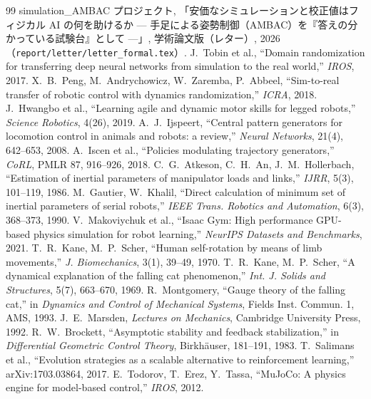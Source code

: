 \documentclass[paper=a4paper,fontsize=10pt,twocolumn,column_gap=2zw,line_length=24zw,number_of_lines=46,head_space=20mm]{jlreq}
\begin{document}
\begin{thebibliography}{99}\footnotesize\setlength{\itemsep}{0pt}
 simulation\_AMBAC プロジェクト, 「安価なシミュレーションと校正値はフィジカル AI の何を助けるか --- 手足による姿勢制御（AMBAC）を『答えの分かっている試験台』として ---」, 学術論文版（レター）, 2026（\texttt{report/letter/letter\_formal.tex}）.
 J.~Tobin et al., ``Domain randomization for transferring deep neural networks from simulation to the real world,'' \textit{IROS}, 2017.
 X.~B.~Peng, M.~Andrychowicz, W.~Zaremba, P.~Abbeel, ``Sim-to-real transfer of robotic control with dynamics randomization,'' \textit{ICRA}, 2018.
 J.~Hwangbo et al., ``Learning agile and dynamic motor skills for legged robots,'' \textit{Science Robotics}, 4(26), 2019.
 A.~J.~Ijspeert, ``Central pattern generators for locomotion control in animals and robots: a review,'' \textit{Neural Networks}, 21(4), 642--653, 2008.
 A.~Iscen et al., ``Policies modulating trajectory generators,'' \textit{CoRL}, PMLR 87, 916--926, 2018.
 C.~G.~Atkeson, C.~H.~An, J.~M.~Hollerbach, ``Estimation of inertial parameters of manipulator loads and links,'' \textit{IJRR}, 5(3), 101--119, 1986.
 M.~Gautier, W.~Khalil, ``Direct calculation of minimum set of inertial parameters of serial robots,'' \textit{IEEE Trans. Robotics and Automation}, 6(3), 368--373, 1990.
 V.~Makoviychuk et al., ``Isaac Gym: High performance GPU-based physics simulation for robot learning,'' \textit{NeurIPS Datasets and Benchmarks}, 2021.
 T.~R.~Kane, M.~P.~Scher, ``Human self-rotation by means of limb movements,'' \textit{J. Biomechanics}, 3(1), 39--49, 1970.
 T.~R.~Kane, M.~P.~Scher, ``A dynamical explanation of the falling cat phenomenon,'' \textit{Int. J. Solids and Structures}, 5(7), 663--670, 1969.
 R.~Montgomery, ``Gauge theory of the falling cat,'' in \textit{Dynamics and Control of Mechanical Systems}, Fields Inst. Commun. 1, AMS, 1993.
 J.~E.~Marsden, \textit{Lectures on Mechanics}, Cambridge University Press, 1992.
 R.~W.~Brockett, ``Asymptotic stability and feedback stabilization,'' in \textit{Differential Geometric Control Theory}, Birkhäuser, 181--191, 1983.
 T.~Salimans et al., ``Evolution strategies as a scalable alternative to reinforcement learning,'' arXiv:1703.03864, 2017.
 E.~Todorov, T.~Erez, Y.~Tassa, ``MuJoCo: A physics engine for model-based control,'' \textit{IROS}, 2012.

\end{thebibliography}
\end{document}
